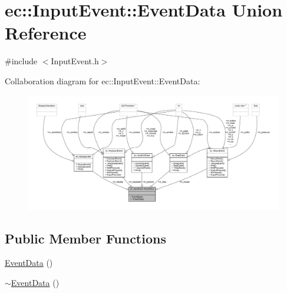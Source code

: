 \hypertarget{unionec_1_1_input_event_1_1_event_data}{}\section{ec\+:\+:Input\+Event\+:\+:Event\+Data Union Reference}
\label{unionec_1_1_input_event_1_1_event_data}


{\ttfamily \#include $<$Input\+Event.\+h$>$}



Collaboration diagram for ec\+:\+:Input\+Event\+:\+:Event\+Data\+:
\nopagebreak
\begin{figure}[H]
\begin{center}
\leavevmode
\includegraphics[width=350pt]{unionec_1_1_input_event_1_1_event_data__coll__graph}
\end{center}
\end{figure}
\subsection*{Public Member Functions}
\begin{DoxyCompactItemize}
\item 
\mbox{\hyperlink{unionec_1_1_input_event_1_1_event_data_a07feefe51335e0521a10f2032d5a7dbc}{Event\+Data}} ()
\item 
\mbox{\hyperlink{unionec_1_1_input_event_1_1_event_data_aa5609c794c2f689ecea99efa7c1a16b0}{$\sim$\+Event\+Data}} ()
\end{DoxyCompactItemize}
